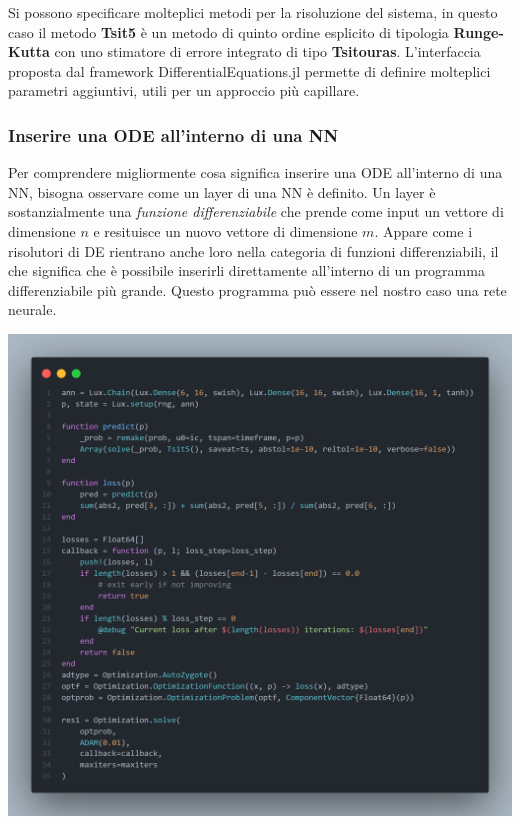 Si possono specificare molteplici metodi per la risoluzione del sistema, in 
questo caso il metodo \textbf{Tsit5} \cite{10.1016/j.camwa.2011.06.002} è un metodo 
di quinto ordine esplicito di tipologia \textbf{Runge-Kutta} con uno stimatore di errore
integrato di tipo \textbf{Tsitouras}. L'interfaccia proposta dal framework DifferentialEquations.jl 
permette di definire molteplici parametri aggiuntivi, utili per un approccio più capillare.

\subsubsection*{Inserire una ODE all'interno di una NN}
Per comprendere migliormente cosa significa inserire una ODE all'interno di una 
NN, bisogna osservare come un layer di una NN è definito. Un layer è sostanzialmente
una \emph{funzione differenziabile} che prende come input un vettore di dimensione $n$ 
e resituisce un nuovo vettore di dimensione $m$. Appare come i risolutori di DE rientrano 
anche loro nella categoria di funzioni differenziabili, il che significa che è possibile
inserirli direttamente all'interno di un programma differenziabile più grande.
Questo programma può essere nel nostro caso una rete neurale. 

\begin{minipage}{\linewidth}
    \centering
    \includegraphics[width=\textwidth]{img/fann.png}
    \label{fig:NN_Julia_example}
\end{minipage}

